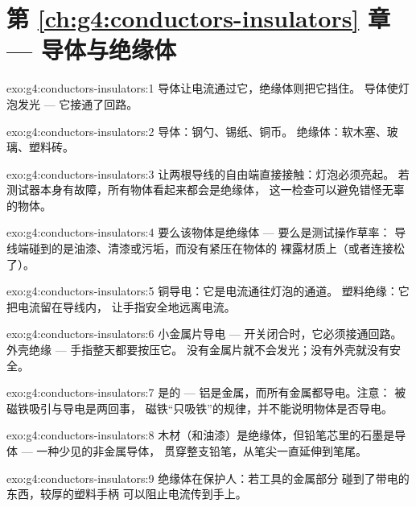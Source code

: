\section*{第 \ref{ch:g4:conductors-insulators} 章 --- 导体与绝缘体}

\begin{solution}{exo:g4:conductors-insulators:1}
导体让电流通过它，绝缘体则把它挡住。
导体使灯泡发光 --- 它接通了回路。
\end{solution}

\begin{solution}{exo:g4:conductors-insulators:2}
导体：钢勺、锡纸、铜币。
绝缘体：软木塞、玻璃、塑料砖。
\end{solution}

\begin{solution}{exo:g4:conductors-insulators:3}
让两根导线的自由端直接接触：灯泡必须亮起。
若测试器本身有故障，所有物体看起来都会是绝缘体，
这一检查可以避免错怪无辜的物体。
\end{solution}

\begin{solution}{exo:g4:conductors-insulators:4}
要么该物体是绝缘体 --- 要么是测试操作草率：
导线端碰到的是油漆、清漆或污垢，而没有紧压在物体的
裸露材质上（或者连接松了）。
\end{solution}

\begin{solution}{exo:g4:conductors-insulators:5}
铜导电：它是电流通往灯泡的通道。
塑料绝缘：它把电流留在导线内，
让手指安全地远离电流。
\end{solution}

\begin{solution}{exo:g4:conductors-insulators:6}
小金属片导电 --- 开关闭合时，它必须接通回路。
外壳绝缘 --- 手指整天都要按压它。
没有金属片就不会发光；没有外壳就没有安全。
\end{solution}

\begin{solution}{exo:g4:conductors-insulators:7}
是的 --- 铝是金属，而所有金属都导电。注意：
被磁铁吸引与导电是两回事，
磁铁“只吸铁”的规律，并不能说明物体是否导电。
\end{solution}

\begin{solution}{exo:g4:conductors-insulators:8}
木材（和油漆）是绝缘体，但铅笔芯里的石墨是导体 ---
一种少见的非金属导体，
贯穿整支铅笔，从笔尖一直延伸到笔尾。
\end{solution}

\begin{solution}{exo:g4:conductors-insulators:9}
绝缘体在保护人：若工具的金属部分
碰到了带电的东西，较厚的塑料手柄
可以阻止电流传到手上。
\end{solution}

